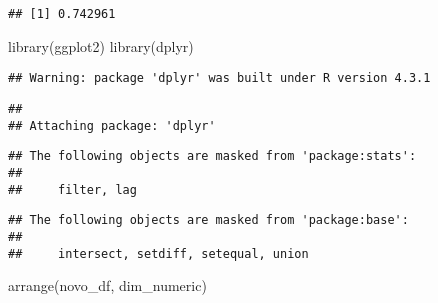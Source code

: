 \documentclass[
]{article}
\newenvironment{Shaded}{\begin{snugshade}}{\end{snugshade}}
\newcommand{\FunctionTok}[1]{\textcolor[rgb]{0.00,0.00,0.00}{#1}}
\newcommand{\NormalTok}[1]{#1}
\begin{document}
\begin{verbatim}
## [1] 0.742961
\end{verbatim}

\begin{Shaded}
\begin{Highlighting}[]
\FunctionTok{library}\NormalTok{(ggplot2)}
\FunctionTok{library}\NormalTok{(dplyr)}
\end{Highlighting}
\end{Shaded}

\begin{verbatim}
## Warning: package 'dplyr' was built under R version 4.3.1
\end{verbatim}

\begin{verbatim}
## 
## Attaching package: 'dplyr'
\end{verbatim}

\begin{verbatim}
## The following objects are masked from 'package:stats':
## 
##     filter, lag
\end{verbatim}

\begin{verbatim}
## The following objects are masked from 'package:base':
## 
##     intersect, setdiff, setequal, union
\end{verbatim}

\begin{Shaded}
\begin{Highlighting}[]
\FunctionTok{arrange}\NormalTok{(novo\_df, dim\_numeric)}
\end{Highlighting}
\end{Shaded}
\end{document}
